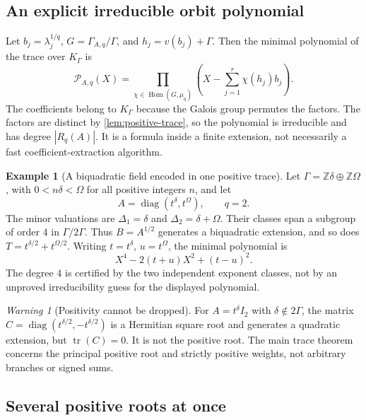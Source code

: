 \documentclass[11pt,letterpaper]{article}
\numberwithin{equation}{section}
\theoremstyle{definition}
\newtheorem{example}[theorem]{Example}
\theoremstyle{remark}
\newtheorem{warning}[theorem]{Warning}
\newcommand{\Z}{\mathbb Z}
\newcommand{\diag}{\operatorname{diag}}
\newcommand{\tr}{\operatorname{tr}}
\newcommand{\Hom}{\operatorname{Hom}}
\newcommand{\KG}{K_{\Gamma}}
\begin{document}
\subsection{An explicit irreducible orbit polynomial}

Let $b_j=\lambda_j^{1/q}$, $G=\Gamma_{A,q}/\Gamma$, and
$h_j=v(b_j)+\Gamma$. Then the minimal polynomial of the trace over $\KG$ is
\begin{equation}\label{eq:orbit-poly}
 \mathcal P_{A,q}(X)=
 \prod_{\chi\in\Hom(G,\mu_q)}
 \left(X-\sum_{j=1}^r\chi(h_j)b_j\right).
\end{equation}
The coefficients belong to $\KG$ because the Galois group permutes the
factors. The factors are distinct by \cref{lem:positive-trace}, so the
polynomial is irreducible and has degree $|R_q(A)|$. It is a formula inside
a finite extension, not necessarily a fast coefficient-extraction algorithm.

\begin{example}[A biquadratic field encoded in one positive trace]
Let $\Gamma=\Z\delta\oplus\Z\Omega$, with $0<n\delta<\Omega$ for all
positive integers $n$, and let
\[
 A=\diag(t^\delta,t^\Omega),\qquad q=2.
\]
The minor valuations are $\Delta_1=\delta$ and
$\Delta_2=\delta+\Omega$. Their classes span a subgroup of order $4$ in
$\Gamma/2\Gamma$. Thus $B=A^{1/2}$ generates a biquadratic extension, and
so does
$T=t^{\delta/2}+t^{\Omega/2}$. Writing $t=t^\delta$, $u=t^\Omega$, the
minimal polynomial is
\begin{equation}\label{eq:biquadratic}
 X^4-2(t+u)X^2+(t-u)^2.
\end{equation}
The degree $4$ is certified by the two independent exponent classes, not
by an unproved irreducibility guess for the displayed polynomial.
\end{example}

\begin{warning}[Positivity cannot be dropped]
For $A=t^\delta I_2$ with $\delta\notin2\Gamma$, the matrix
$C=\diag(t^{\delta/2},-t^{\delta/2})$ is a Hermitian square root and generates
a quadratic extension, but $\tr(C)=0$. It is not the positive root.
The main trace theorem concerns the principal positive root and strictly
positive weights, not arbitrary branches or signed sums.
\end{warning}

\subsection{Several positive roots at once}
\end{document}
